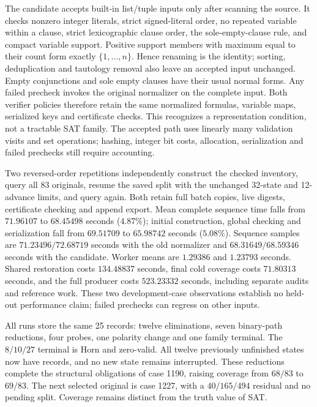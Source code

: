 \documentclass[11pt,a4paper]{article}
\numberwithin{equation}{section}
\theoremstyle{plain}
\theoremstyle{definition}
\theoremstyle{remark}
\begin{document}
The candidate accepts built-in list/tuple inputs only after scanning the source.
It checks nonzero integer literals, strict signed-literal order, no repeated
variable within a clause, strict lexicographic clause order, the sole-empty-clause
rule, and compact variable support. Positive support members with maximum equal
to their count form exactly $\{1,\ldots,n\}$. Hence renaming is the identity;
sorting, deduplication and tautology removal also leave an accepted input
unchanged. Empty conjunctions and sole empty clauses have their usual normal
forms. Any failed precheck invokes the original normalizer on the complete
input. Both verifier policies therefore retain the same normalized formulas,
variable maps, serialized keys and certificate checks. This recognizes a
representation condition, not a tractable SAT family. The accepted path uses
linearly many validation visits and set operations; hashing, integer bit costs,
allocation, serialization and failed prechecks still require accounting.

Two reversed-order repetitions independently construct the checked inventory,
query all 83 originals, resume the saved split with the unchanged 32-state and
12-advance limits, and query again. Both retain full batch copies, live digests,
certificate checking and append export. Mean complete sequence time falls from
$71.96107$ to $68.45498$ seconds ($4.87\%$); initial construction, global checking
and serialization fall from $69.51709$ to $65.98742$ seconds ($5.08\%$).
Sequence samples are $71.23496/72.68719$ seconds with the old normalizer and
$68.31649/68.59346$ seconds with the candidate. Worker means are $1.29386$ and
$1.23793$ seconds. Shared restoration costs $134.48837$ seconds, final cold
coverage costs $71.80313$ seconds, and the full producer costs $523.23332$
seconds, including separate audits and reference work. These two development-case
observations establish no held-out performance claim; failed prechecks can
regress on other inputs.

All runs store the same 25 records: twelve eliminations, seven binary-path
reductions, four probes, one polarity change and one family terminal. The
$8/10/27$ terminal is Horn and zero-valid. All twelve previously unfinished
states now have records, and no new state remains interrupted. These reductions
complete the structural obligations of case 1190, raising coverage from $68/83$
to $69/83$. The next selected original is case 1227, with a $40/165/494$ residual
and no pending split. Coverage remains distinct from the truth value of SAT.
\end{document}
